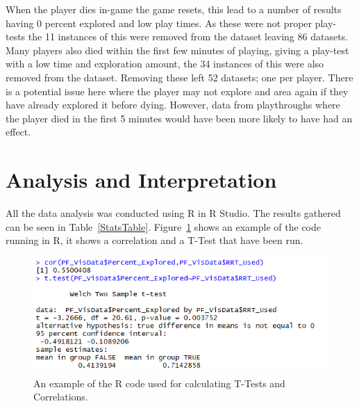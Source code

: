\documentclass[journal]{IEEEtran}
\begin{document}
	When the player dies in-game the game resets, this lead to a number of results having 0 percent explored and low play times. As these were not proper play-tests the 11 instances of this were removed from the dataset leaving 86 datasets. Many players also died within the first few minutes of playing, giving a play-test with a low time and exploration amount, the 34 instances of this were also removed from the dataset. Removing these left 52 datasets; one per player. There is a potential issue here where the player may not explore and area again if they have already explored it before dying. However, data from playthroughs where the player died in the first 5 minutes would have been more likely to have had an effect. 
	
	\section{Analysis and Interpretation} \label{Analysis}
	All the data analysis was conducted using R in R Studio. The results gathered can be seen in Table~\ref{StatsTable}.  Figure~\ref{image:RCor} shows an example of the code running in R, it shows a correlation and a T-Test that have been run. 
	
	\begin{figure}[h]
		\includegraphics[width=1.0\linewidth]{RCor.png}
		\caption{An example of the R code used for calculating T-Tests and Correlations.}
		\label{image:RCor}
	\end{figure}  
	
\end{document}
